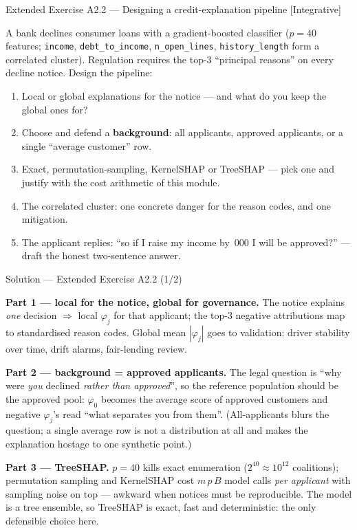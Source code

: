 \documentclass[aspectratio=169,11pt]{beamer}
\begin{document}
\begin{frame}{Extended Exercise A2.2 --- Designing a credit-explanation pipeline [Integrative]}
\begin{longexercise}
  A bank declines consumer loans with a gradient-boosted classifier
  ($p=40$ features; \texttt{income}, \texttt{debt\_to\_income},
  \texttt{n\_open\_lines}, \texttt{history\_length} form a correlated cluster).
  Regulation requires the top-3 ``principal reasons'' on every decline notice.
  Design the pipeline:
  \begin{enumerate}
    \item Local or global explanations for the notice --- and what do you keep the
          global ones for?
    \item Choose and defend a \textbf{background}: all applicants, approved
          applicants, or a single ``average customer'' row.
    \item Exact, permutation-sampling, KernelSHAP or TreeSHAP --- pick one and
          justify with the cost arithmetic of this module.
    \item The correlated cluster: one concrete danger for the reason codes, and
          one mitigation.
    \item The applicant replies: ``so if I raise my income by \,000 I
          will be approved?'' --- draft the honest two-sentence answer.
  \end{enumerate}
\end{longexercise}
\end{frame}

\begin{frame}{Solution --- Extended Exercise A2.2 (1/2)}
\begin{solutionbox}
  \textbf{Part 1 --- local for the notice, global for governance.} The notice
  explains \emph{one} decision $\Rightarrow$ local $\varphi_j$ for that applicant;
  the top-3 negative attributions map to standardised reason codes. Global mean
  $|\varphi_j|$ goes to validation: driver stability over time, drift alarms,
  fair-lending review.

  \smallskip
  \textbf{Part 2 --- background = approved applicants.} The legal question is
  ``why were \emph{you} declined \emph{rather than approved}'', so the reference
  population should be the approved pool: $\varphi_0$ becomes the average score of
  approved customers and negative $\varphi_j$'s read ``what separates you from
  them''. (All-applicants blurs the question; a single average row is not a
  distribution at all and makes the explanation hostage to one synthetic point.)

  \smallskip
  \textbf{Part 3 --- TreeSHAP.} $p=40$ kills exact enumeration
  ($2^{40}\approx10^{12}$ coalitions); permutation sampling and KernelSHAP cost
  $m\,p\,B$ model calls \emph{per applicant} with sampling noise on top --- awkward
  when notices must be reproducible. The model is a tree ensemble, so TreeSHAP is
  exact, fast and deterministic: the only defensible choice here.
\end{solutionbox}
\end{frame}
\end{document}
